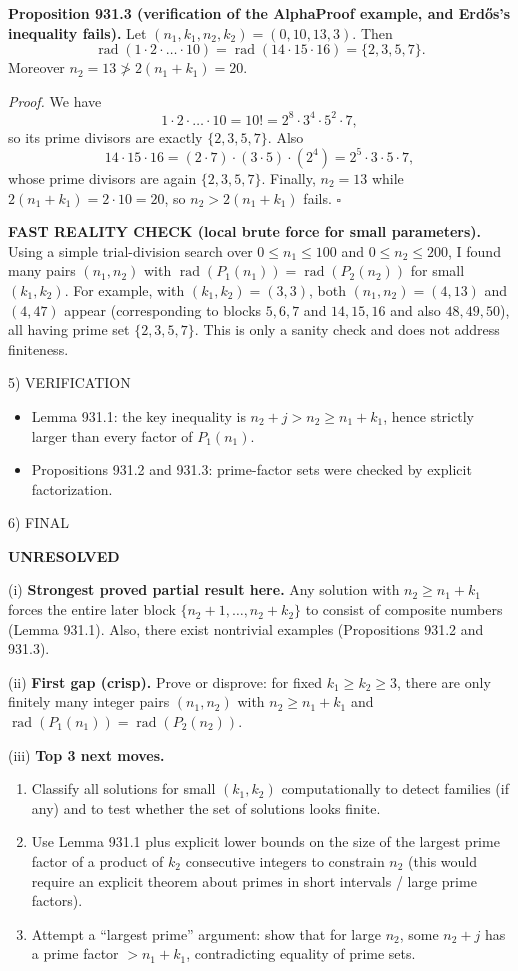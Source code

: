 \medskip
\textbf{Proposition 931.3 (verification of the AlphaProof example, and Erd\H{o}s's inequality fails).}
Let $(n_1,k_1,n_2,k_2)=(0,10,13,3)$. Then
\[
\operatorname{rad}(1\cdot2\cdot\dots\cdot 10)=\operatorname{rad}(14\cdot15\cdot16)=\{2,3,5,7\}.
\]
Moreover $n_2=13\not>2(n_1+k_1)=20$.

\emph{Proof.}
We have
\[
1\cdot2\cdot\dots\cdot 10 = 10! = 2^8\cdot 3^4\cdot 5^2\cdot 7,
\]
so its prime divisors are exactly $\{2,3,5,7\}$.
Also
\[
14\cdot15\cdot16 = (2\cdot7)\cdot(3\cdot5)\cdot(2^4)=2^5\cdot3\cdot5\cdot7,
\]
whose prime divisors are again $\{2,3,5,7\}$.
Finally, $n_2=13$ while $2(n_1+k_1)=2\cdot10=20$, so $n_2>2(n_1+k_1)$ fails.
\hfill$\square$

\medskip
\textbf{FAST REALITY CHECK (local brute force for small parameters).}
Using a simple trial-division search over $0\le n_1\le 100$ and $0\le n_2\le 200$, I found many pairs $(n_1,n_2)$ with $\operatorname{rad}(P_1(n_1))=\operatorname{rad}(P_2(n_2))$ for small $(k_1,k_2)$.
For example, with $(k_1,k_2)=(3,3)$, both $(n_1,n_2)=(4,13)$ and $(4,47)$ appear (corresponding to blocks $5,6,7$ and $14,15,16$ and also $48,49,50$), all having prime set $\{2,3,5,7\}$.
This is only a sanity check and does not address finiteness.

5) VERIFICATION

\begin{itemize}
\item Lemma 931.1: the key inequality is $n_2+j>n_2\ge n_1+k_1$, hence strictly larger than every factor of $P_1(n_1)$.
\item Propositions 931.2 and 931.3: prime-factor sets were checked by explicit factorization.
\end{itemize}

6) FINAL

\textbf{UNRESOLVED}

(i) \textbf{Strongest proved partial result here.}
Any solution with $n_2\ge n_1+k_1$ forces the entire later block $\{n_2+1,\dots,n_2+k_2\}$ to consist of composite numbers (Lemma 931.1). Also, there exist nontrivial examples (Propositions 931.2 and 931.3).

(ii) \textbf{First gap (crisp).}
Prove or disprove: for fixed $k_1\ge k_2\ge 3$, there are only finitely many integer pairs $(n_1,n_2)$ with $n_2\ge n_1+k_1$ and $\operatorname{rad}(P_1(n_1))=\operatorname{rad}(P_2(n_2))$.

(iii) \textbf{Top 3 next moves.}
\begin{enumerate}
\item Classify all solutions for small $(k_1,k_2)$ computationally to detect families (if any) and to test whether the set of solutions looks finite.
\item Use Lemma 931.1 plus explicit lower bounds on the size of the largest prime factor of a product of $k_2$ consecutive integers to constrain $n_2$ (this would require an explicit theorem about primes in short intervals / large prime factors).
\item Attempt a ``largest prime'' argument: show that for large $n_2$, some $n_2+j$ has a prime factor $>n_1+k_1$, contradicting equality of prime sets.
\end{enumerate}

